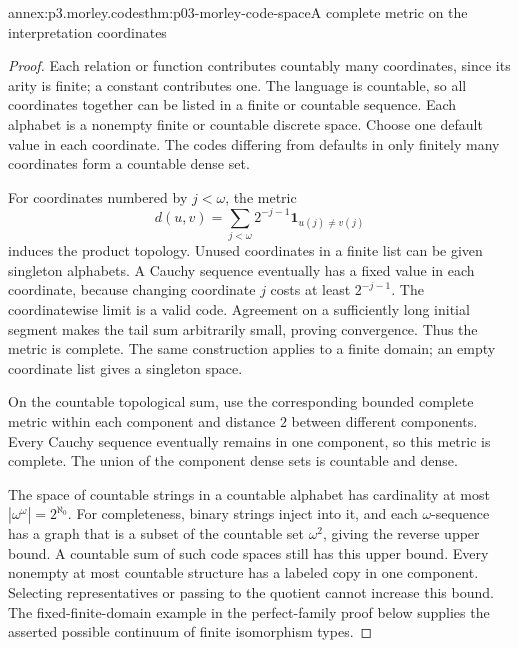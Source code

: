 \begin{annexitem}{annex:p3.morley.codes}{thm:p03-morley-code-space}{A complete metric on the interpretation coordinates}
\begin{proof}
Each relation or function contributes countably many
coordinates, since its arity is finite; a constant
contributes one. The language is countable, so all
coordinates together can be listed in a finite or
countable sequence. Each alphabet is a nonempty finite
or countable discrete space. Choose one default value
in each coordinate. The codes differing from defaults
in only finitely many coordinates form a countable
dense set.

For coordinates numbered by \(j<\omega\), the metric
\[
 d(u,v)=\sum_{j<\omega}2^{-j-1}
                         \mathbf1_{u(j)\ne v(j)}
\]
induces the product topology. Unused coordinates in a
finite list can be given singleton alphabets.
A Cauchy sequence eventually has a fixed value in
each coordinate, because changing coordinate \(j\)
costs at least \(2^{-j-1}\).
The coordinatewise limit is a valid code.
Agreement on a sufficiently long initial segment makes
the tail sum arbitrarily small, proving convergence.
Thus the metric is complete.
The same construction applies to a finite domain;
an empty coordinate list gives a singleton space.

On the countable topological sum, use the corresponding
bounded complete metric within each component and
distance \(2\) between different components.
Every Cauchy sequence eventually remains in one component,
so this metric is complete. The union of the component
dense sets is countable and dense.

The space of countable strings in a countable alphabet
has cardinality at most \(|\omega^\omega|=2^{\aleph_0}\).
For completeness, binary strings inject into it, and
each \(\omega\)-sequence has a graph that is a subset
of the countable set \(\omega^2\), giving the reverse
upper bound. A countable sum of such code spaces still
has this upper bound.
Every nonempty at most countable structure has a labeled
copy in one component. Selecting representatives or
passing to the quotient cannot increase this bound.
The fixed-finite-domain example in the perfect-family
proof below supplies the asserted possible continuum
of finite isomorphism types.
\end{proof}
\end{annexitem}

